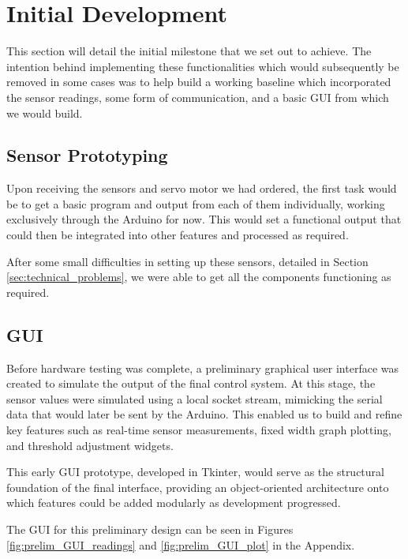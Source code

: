 \documentclass[a4paper,11pt]{article}
\begin{document}
\section{Initial Development}
\label{sec:initial_development}

This section will detail the initial milestone that we set out to achieve.
The intention behind implementing these functionalities
which would subsequently be removed in some cases
was to help build a working baseline which incorporated the sensor readings,
some form of communication, and a basic GUI from which we would build.

\subsection{Sensor Prototyping}
\label{sec:sensor_prototyping}

Upon receiving the sensors and servo motor we had ordered,
the first task would be to get a basic program and output from each of them individually,
working exclusively through the Arduino for now.
This would set a functional output that could then be integrated into other features
and processed as required.

After some small difficulties in setting up these sensors,
detailed in Section \ref{sec:technical_problems},
we were able to get all the components functioning as required.

\subsection{GUI}
\label{sec:gui_simulation}

Before hardware testing was complete, a preliminary graphical user interface was created 
to simulate the output of the final control system. 
At this stage, the sensor values were simulated using a local socket stream, mimicking 
the serial data that would later be sent by the Arduino. This enabled us to build and 
refine key features such as real-time sensor measurements,
fixed width graph plotting, and threshold adjustment widgets.

This early GUI prototype, developed in Tkinter, would serve as the structural 
foundation of the final interface, providing an object-oriented architecture 
onto which features could be added modularly as development progressed.

The GUI for this preliminary design can be seen in 
Figures \ref{fig:prelim_GUI_readings} and \ref{fig:prelim_GUI_plot} in the Appendix.
\end{document}

